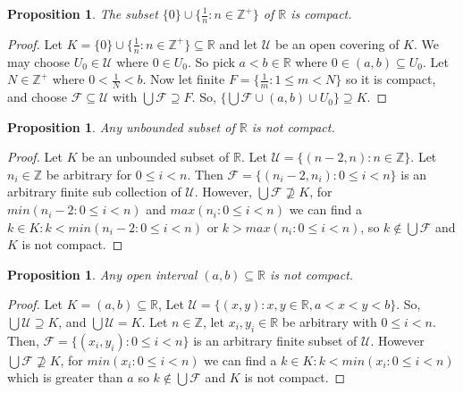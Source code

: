 \documentclass{amsart}
\theoremstyle{plain}
\newtheorem{proposition}[theorem]{Proposition}
\theoremstyle{definition}
\theoremstyle{remark}
\begin{document}
	\begin{proposition}
	  The subset \(\{0\}\cup\{\frac{1}{n}:n\in\mathbb Z^+\}\) of \(\mathbb R\) is compact.
	\end{proposition}

	\begin{proof}
	Let $K = \lbrace 0 \rbrace \cup \lbrace \frac{1}{n} : n \in \mathbb{Z^+} \rbrace \subseteq \mathbb{R}$ and let $\mathcal{U}$ be an open covering of $K$. We may choose $U_0 \in \mathcal{U}$ where $0 \in U_0$. So pick $a<b \in \mathbb{R}$ where $0 \in (a, b) \subseteq U_0$. Let $N \in \mathbb{Z}^+$ where $0 < \frac{1}{N} < b$. Now let finite $F = \lbrace \frac{1}{m} : 1 \leq m < N \rbrace$ so it is compact, and choose $\mathcal{F} \subseteq \mathcal{U}$ with $\bigcup \mathcal{F} \supseteq F$. So, $\lbrace \bigcup \mathcal{F} \cup (a,b) \cup U_0 \rbrace \supseteq K$.
	\end{proof}

	\begin{proposition}
	  Any unbounded subset of \(\mathbb R\) is not compact.
	\end{proposition}
	\begin{proof}
	Let $K$ be an unbounded subset of $\mathbb{R}$. Let $\mathcal{U} = \lbrace (n-2, n) : n \in \mathbb{Z} \rbrace$. Let $n_i \in \mathbb{Z}$ be arbitrary for $0 \leq i < n$. Then $\mathcal{F} = \lbrace (n_i - 2, n_i) : 0 \leq i < n \rbrace$ is an arbitrary finite sub collection of $\mathcal{U}$. However, $\bigcup \mathcal{F} \not\supseteq K$, for $min(n_i-2: 0 \leq i < n)$ and $max(n_i : 0 \leq i < n)$ we can find a $k \in K : k < min(n_i-2: 0 \leq i < n)$ or $k > max(n_i : 0 \leq i < n)$, so $k  \not\in \bigcup \mathcal{F}$ and $K$ is not compact.
	\end{proof}	

	\begin{proposition}
	  Any open interval \((a,b)\subseteq\mathbb R\) is not compact.
	\end{proposition}
	\begin{proof}
	Let $K = (a, b) \subseteq \mathbb{R}$, Let $\mathcal{U} = \lbrace (x, y) : x, y \in \mathbb{R}, a < x < y < b \rbrace$. So, $\bigcup \mathcal{U} \supseteq K$, and $\bigcup \mathcal{U} = K$. Let $n \in \mathbb{Z}$, let $x_i, y_i \in \mathbb{R}$ be arbitrary with $0 \leq i < n$. Then, $\mathcal{F} = \lbrace (x_i, y_i) : 0 \leq i < n \rbrace$ is an arbitrary finite subset of $\mathcal{U}$. However $\bigcup \mathcal{F} \not\supseteq K$, for $min(x_i : 0 \leq i < n)$ we can find a $k \in K : k < min(x_i : 0 \leq i < n)$ which is greater than $a$ so $k \not\in \bigcup \mathcal{F}$ and $K$ is not compact.
	\end{proof}
\end{document}
